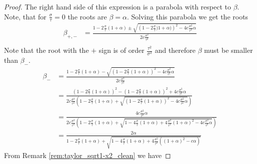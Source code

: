 \documentclass[12pt]{article}
\theoremstyle{remark}
\newcommand{\lrbrackets}[1]{\left( #1 \right)}
\begin{document}
\begin{appendices}
\begin{proof}
	The right hand side of this expression is a parabola with respect to $\beta$.
	Note, that for $\frac{\sigma}{\tau} = 0$ the roots are $\beta = \alpha$.
	Solving this parabola we get the roots
	\begin{align*}
	\beta_{+,-} 
	&=
	\frac{1-2\frac{\sigma}{\tau}(1+\alpha) \pm \sqrt{\lrbrackets{1-2\frac{\sigma}{\tau})1+\alpha)}^2 - 4c \frac{\sigma^2}{\tau^2}\alpha }}{2c\frac{\sigma^2}{\tau^2}} \\
	\end{align*} 
 Note that the root with the $+$ sign is of order $\frac{\tau^2}{\sigma^2}$ and therefore $\beta$ must be smaller than $\beta_-$.
 	\begin{align*}
	\beta_{-} 
	&=
	\frac{1-2\frac{\sigma}{\tau}(1+\alpha) - \sqrt{\lrbrackets{1-2\frac{\sigma}{\tau}(1+\alpha)}^2 - 4c \frac{\sigma^2}{\tau^2}\alpha }}{2c\frac{\sigma^2}{\tau^2}} 
 \\
 &=\frac{(1-2\frac{\sigma}{\tau}(1+\alpha))^2 - \lrbrackets{1-2\frac{\sigma}{\tau}(1+\alpha)}^2 + 4c \frac{\sigma^2}{\tau^2}\alpha}
 {2c \frac{\sigma^2}{\tau^2}  \left(1-2\frac{\sigma}{\tau}(1+\alpha) + \sqrt{\lrbrackets{1-2\frac{\sigma}{\tau}(1+\alpha)}^2 - 4c \frac{\sigma^2}{\tau^2}\alpha }\right)}
  \\
  &=
\frac{4c \frac{\sigma^2}{\tau^2}\alpha}
  {2c\frac{\sigma^2}{\tau^2} \left(1-2\frac{\sigma}{\tau}(1+\alpha) +\sqrt{1-4\frac{\sigma}{\tau}(1+\alpha) + 4\frac{\sigma^2}{\tau^2}(1+\alpha)^2- 4c\frac{\sigma^2}{\tau^2}\alpha }\right)}
\\
  &=
\frac{2 \alpha}
  {1-2\frac{\sigma}{\tau}(1+\alpha) +\sqrt{1-4\frac{\sigma}{\tau}(1+\alpha) + 4\frac{\sigma^2}{\tau^2}\left((1+\alpha)^2- c\alpha\right) }}
	\end{align*} 
From Remark \ref{rem:taylor_sqrt1-x2_clean}  we have


\end{proof}
\end{appendices}
\end{document}

